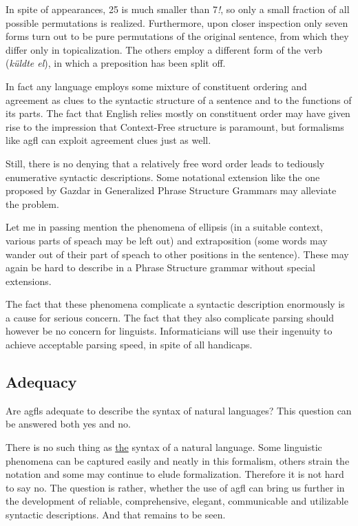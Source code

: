 In spite of appearances, 25 is much smaller than 7{\sl !}, so only a small
fraction of all possible permutations is realized. Furthermore, upon closer
inspection only seven forms turn out to be pure permutations of the original
sentence, from which they differ only in topicalization.
The others employ a different form of the verb ({\em k\"uldte el}),
in which a preposition has been split off.

In fact any language employs some mixture of constituent ordering and agreement
as clues to the syntactic structure of a sentence and to the functions of
its parts. The fact that English relies mostly on constituent order may
have given rise to the impression that Context-Free structure is paramount,
but formalisms like {\sc agfl} can exploit agreement clues just
as well.

Still, there is no denying that a relatively free word order leads to
tediously enumerative syntactic descriptions. Some notational extension
like the one proposed by Gazdar in Generalized Phrase Structure Grammars
\cite{gazdar:gpsg} may alleviate the problem.

Let me in passing mention the phenomena of ellipsis (in a suitable
context, various parts of speach may be left out) and extraposition (some
words may wander out of their part of speach to other positions in the
sentence). These may again be hard to describe in a Phrase Structure
grammar without special extensions.

The fact that these phenomena complicate a syntactic description enormously
is a cause for serious concern. The fact that they also complicate parsing
should however be no concern for linguists.
Informaticians will use their ingenuity
to achieve acceptable parsing speed, in spite of all handicaps.
\subsection{Adequacy}
Are {\sc agfl}s adequate to describe the syntax of natural languages?
This question can be answered both yes and no.

There is no such thing as \underline{the} syntax of a natural language.
Some linguistic phenomena can be captured easily and neatly in this
formalism, others strain the notation and some may continue to elude
formalization. Therefore it is not hard to say no. The question is rather,
whether the use of {\sc agfl} can bring us further in the development of
reliable, comprehensive, elegant, communicable and utilizable syntactic
descriptions. And that remains to be seen.

